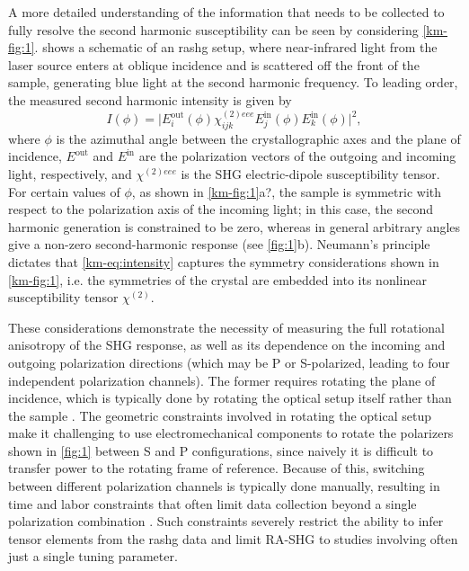 A more detailed understanding of the information that needs to be collected to fully resolve the second harmonic susceptibility can be seen by considering \cref{km-fig:1}.
 shows a schematic of an \gls{rashg} setup, where near-infrared light from the laser source enters at oblique incidence and is scattered off the front of the sample, generating blue light at the second harmonic frequency.
To leading order, the measured second harmonic intensity is given by
\begin{equation}
I(\phi) = \big| E^{\mathrm{out}}_i(\phi) \chi^{(2)eee}_{ijk} E^{\mathrm{in}}_j(\phi) E^{\mathrm{in}}_k(\phi)\big|^2,
    \label{km-eq:intensity}
\end{equation}
where $\phi$ is the azimuthal angle between the crystallographic axes and the plane of incidence, $E^{\mathrm{out}}$ and $E^{\mathrm{in}}$ are the polarization vectors of the outgoing and incoming light, respectively, and $\chi^{(2)eee}$ is the SHG electric-dipole susceptibility tensor.
For certain values of $\phi$, as shown in \cref{km-fig:1}a?, the sample is symmetric with respect to the polarization axis of the incoming light; in this case, the second harmonic generation is constrained to be zero, whereas in general arbitrary angles give a non-zero second-harmonic response (see \cref{fig:1}b).
Neumann's principle dictates that \cref{km-eq:intensity} captures the symmetry considerations shown in \cref{km-fig:1}, i.e. the symmetries of the crystal are embedded into its nonlinear susceptibility tensor $\chi^{(2)}$.

These considerations demonstrate the necessity of measuring the full rotational anisotropy of the SHG response, as well as its dependence on the incoming and outgoing polarization directions (which may be P or S-polarized, leading to four independent polarization channels).
The former requires rotating the plane of incidence, which is typically done by rotating the optical setup itself rather than the sample \citep{Petersen2006Nonlinear7,Torchinsky2014ASymmetries, Fichera2020SecondSymmetry, Fichera2023Light-inducedSemiconductor}. 
The geometric constraints involved in rotating the optical setup make it challenging to use electromechanical components to rotate the polarizers shown in \cref{fig:1} between S and P configurations, since naively it is difficult to transfer power to the rotating frame of reference.
Because of this, switching between different polarization channels is typically done manually, resulting in time and labor constraints that often limit data collection beyond a single polarization combination \citep{Shan2021GiantEngineering}.
Such constraints severely restrict the ability to infer tensor elements from the \gls{rashg} data and limit RA-SHG to studies involving often just a single tuning parameter. 

